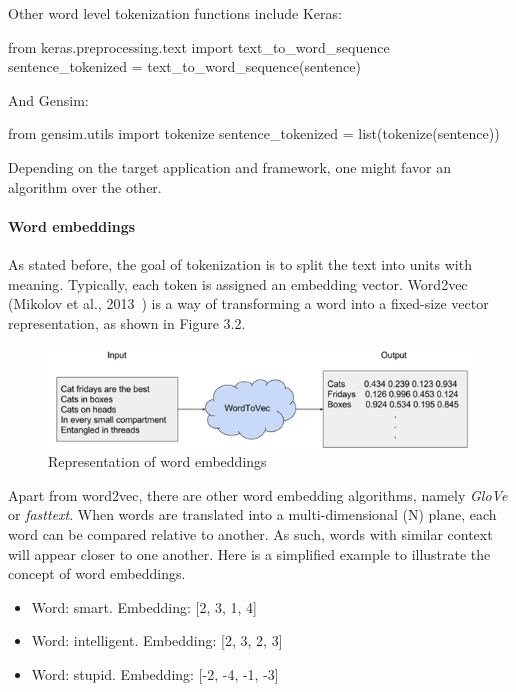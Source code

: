 Other word level tokenization functions include Keras:

\begin{python}
from keras.preprocessing.text import text_to_word_sequence
sentence_tokenized = text_to_word_sequence(sentence)
\end{python}

And Gensim:

\begin{python}
from gensim.utils import tokenize
sentence_tokenized = list(tokenize(sentence))
\end{python}

Depending on the target application and framework, one might favor an algorithm over the other.

\paragraph{Word embeddings}\label{subsec:wordemb}

As stated before, the goal of tokenization is to split the text into units with meaning. Typically, each token is assigned an embedding vector. Word2vec (Mikolov et al., 2013~\cite{mikolov2013efficient}) is a way of transforming a word into a fixed-size vector representation, as shown in Figure 3.2.

\begin{figure}[!ht]
    \centering
    \includegraphics[width=14cm]{figures/word_emb.png}
    \caption{Representation of word embeddings}
\end{figure}

Apart from word2vec, there are other word embedding algorithms, namely \textit{GloVe} or \textit{fasttext}. When words are translated into a multi-dimensional (N) plane, each word can be compared relative to another. As such, words with similar context will appear closer to one another. Here is a simplified example to illustrate the concept of word embeddings.

\begin{itemize}
    \item Word: smart. Embedding: [2, 3, 1, 4]
    \item Word: intelligent. Embedding: [2, 3, 2, 3]
    \item Word: stupid. Embedding: [-2, -4, -1, -3]
\end{itemize}

